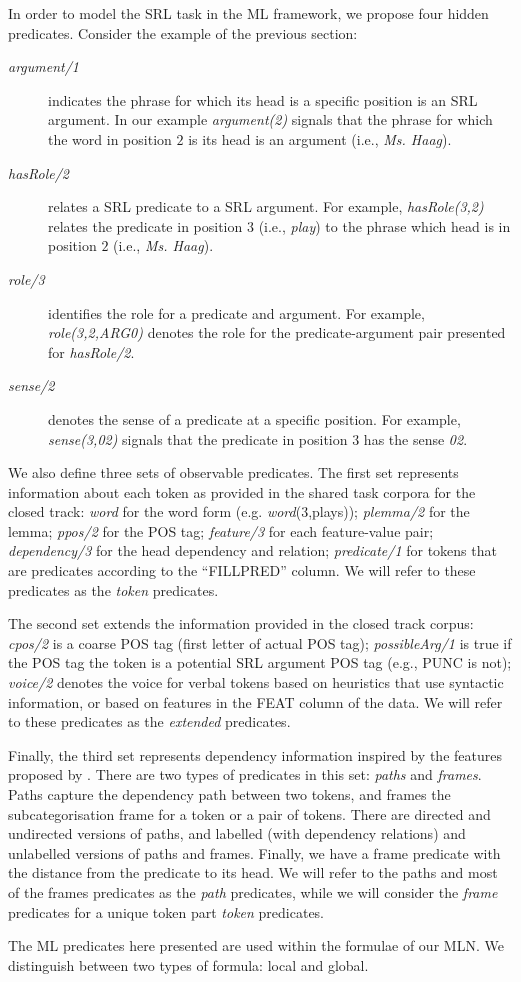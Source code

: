 
In order to model the SRL task in the ML framework, we propose four hidden 
predicates. Consider the example of the previous section:
\begin{description}
    \item [\emph{argument/1}] indicates the phrase for which its head is a 
        specific position is an SRL argument. In our example     
        \emph{argument(2)} signals that the phrase for which the word in 
        position $2$ is its head is an argument (i.e., \emph{Ms. Haag}).
    \item [\emph{hasRole/2}] relates a SRL predicate to a SRL argument. For example, \emph{hasRole(3,2)} relates the
        predicate in position $3$ (i.e., \emph{play}) to the phrase which head 
        is in position $2$ (i.e., \emph{Ms. Haag}).
    \item [\emph{role/3}] identifies the role for a predicate and argument. For example,
        \emph{role(3,2,ARG0)} denotes the role for the predicate-argument pair presented for \emph{hasRole/2}.
    \item [\emph{sense/2}] denotes the sense of a predicate at a
        specific position. For example, \emph{sense(3,02)}
        signals that the predicate in position $3$ has the sense \emph{02}.
\end{description}

We also define three sets of observable predicates. The first set represents information about each token as provided in the shared task corpora for the closed track:  \emph{word} for the word form (e.g. \emph{word}(3,plays)); \emph{plemma/2} for the 
lemma; \emph{ppos/2} for the POS tag; \emph{feature/3} for each feature-value 
pair; \emph{dependency/3} for the head dependency and relation; 
\emph{predicate/1} for tokens that are predicates according to the ``FILLPRED'' column. We will refer to these 
predicates as the \emph{token} predicates. 

The second set extends the information provided in the closed track corpus: 
\emph{cpos/2} is a coarse POS tag (first letter of actual POS tag); \emph{possibleArg/1} is true if the POS tag the token is a potential SRL argument  POS tag (e.g., PUNC is not); \emph{voice/2} denotes the voice for verbal tokens based on heuristics that use
syntactic information, or based on features in the FEAT column of the data. We will 
refer to these predicates as the \emph{extended} predicates.

Finally, the third set represents dependency information inspired by the features proposed by \citet{xue04calibrating}. There are two types of 
predicates in this set: \emph{paths} and \emph{frames}.  Paths capture the 
dependency path between two tokens, and frames the subcategorisation frame for a 
token or a pair of tokens. There are directed and 
undirected versions of paths, and labelled  (with dependency relations) and unlabelled versions of paths and frames. Finally, we have a frame predicate with the distance from the 
predicate to its head.  We will refer to the paths and most of the frames 
predicates as the \emph{path} predicates, while we will consider the 
\emph{frame} predicates for a unique token part \emph{token} predicates.

The ML predicates here presented are used within the formulae of our MLN.  We 
distinguish between two types of formula: local and global. 
